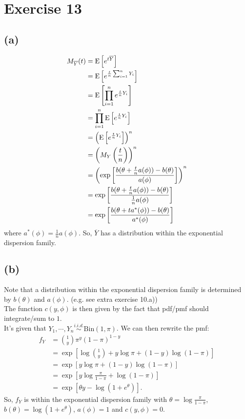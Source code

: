 \section*{Exercise 13}
\subsection*{(a)}
\begin{align*}
M_{\overline{Y}}(t) &= \mathrm{E}\left[e^{t \overline{Y}}\right]\\
&= \mathrm{E}\left[e^{\frac{t}{n} \sum_{i=1}^{n}Y_{i}}\right]\\
&= \mathrm{E}\left[\prod_{i=1}^{n} e^{\frac{t}{n} Y_{i}}\right]\\
&= \prod_{i=1}^{n}\mathrm{E}\left[e^{\frac{t}{n} Y_{i}}\right]\\
&= \left(\mathrm{E}\left[e^{\frac{t}{n} Y_{i}}\right]\right)^{n}\\
&= \left(M_{Y}\left(\frac{t}{n}\right)\right)^{n}\\
&= \left(\exp\left[\frac{b(\theta + \frac{t}{n} a(\phi)) -b(\theta)}{a(\phi)}\right]\right)^{n}\\
&= \exp\left[\frac{b(\theta + \frac{t}{n} a(\phi)) -b(\theta)}{\frac{1}{n}a(\phi)}\right]\\
&= \exp\left[\frac{b(\theta + t a^{*}(\phi)) -b(\theta)}{a^{*}(\phi)}\right]
\end{align*}
where $a^{*}(\phi) = \frac{1}{n}a(\phi)$.
So, $\overline{Y}$ has a distribution within the exponential dispersion family.


\subsection*{(b)}
Note that a distribution within the exponential dispersion family is determined by $b(\theta)$ and $a(\phi)$. (e.g. see extra exercise 10.a))\\
The function $c(y,\phi)$ is then given by the fact that pdf/pmf should integrate/sum to $1$.\\

It's given that $Y_{1}, \cdots, Y_{n} \stackrel{i.i.d.}{\sim} \mathrm{Bin}(1,\pi)$. We can then rewrite the pmf:
\begin{align*}
f_{Y} &= \binom{1}{y}\pi^{y}(1-\pi)^{1-y}\\
&= \exp\left[\log\binom{1}{y} + y\log \pi +(1-y)\log(1-\pi) \right]\\
&= \exp\left[y\log \pi +(1-y)\log(1-\pi) \right]\\
&= \exp\left[y\log\frac{\pi}{1-\pi} +\log(1-\pi)\right]\\
&= \exp\left[\theta y -\log(1+e^{\theta})\right].
\end{align*}
So, $f_{Y}$ is within the exponential dispersion family with $\theta = \log\frac{\pi}{1-\pi}$, $b(\theta) = \log(1+e^{\theta})$, $a(\phi) = 1$ and $c(y,\phi) = 0$.\\

